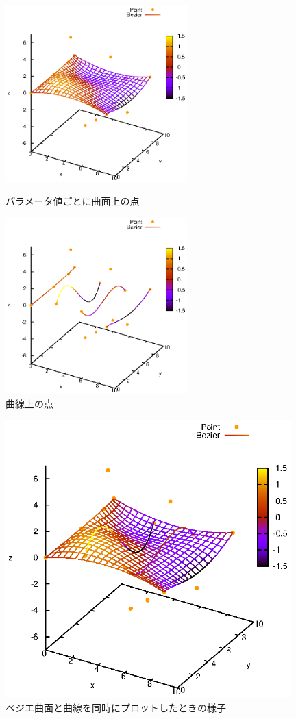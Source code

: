 \documentclass[a4paper,10pt]{jsarticle}
\begin{document}
\begin{figure}[b]
 \begin{minipage}{0.5\hsize}
  \begin{center}
   \includegraphics[width=70mm]{fig/eps/surface.eps}
  \end{center}
  \caption{パラメータ値ごとに曲面上の点}
  \label{fig:パラメータ値ごとに曲面上の点}
 \end{minipage}
 \begin{minipage}{0.5\hsize}
  \begin{center}
   \includegraphics[width=70mm]{fig/eps/curve.eps}
  \end{center}
  \caption{曲線上の点}
  \label{fig:曲線上の点}
 \end{minipage}
\end{figure}

\begin{figure}[b]
  \centering
  \includegraphics[width=110mm]{fig/eps/curve_surface.eps}
  \caption{ベジエ曲面と曲線を同時にプロットしたときの様子}
  \label{fig:ベジエ曲面と曲線を同時にプロットしたときの様子}
\end{figure}
\end{document}
